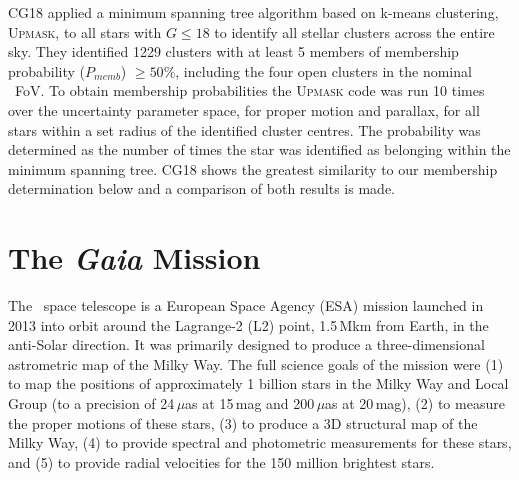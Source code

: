 CG18 applied a minimum spanning tree algorithm based on k-means clustering, \textsc{Upmask}, to all stars with $G\leq18$ to identify all stellar clusters across the entire sky. They identified 1229 clusters with at least 5 members of membership probability ($P_{memb}$) $\geq50\%$, including the four open clusters in the nominal \Kepler~FoV. To obtain membership probabilities the \textsc{Upmask} code was run 10 times over the uncertainty parameter space, for proper motion and parallax, for all stars within a set radius of the identified cluster centres. The probability was determined as the number of times the star was identified as belonging within the minimum spanning tree. CG18 shows the greatest similarity to our membership determination below and a comparison of both results is made.

\section{The {\em Gaia} Mission}
The \Gaia~space telescope is a European Space Agency (ESA) mission launched in 2013 into orbit around the Lagrange-2 (L2) point, 1.5\,Mkm from Earth, in the anti-Solar direction. It was primarily designed to produce a three-dimensional astrometric map of the Milky Way. The full science goals of the mission were (1) to map the positions of approximately 1 billion stars in the Milky Way and Local Group (to a precision of 24\,$\mu$as at 15\,mag and 200\,$\mu$as at 20\,mag), (2) to measure the proper motions of these stars, (3) to produce a 3D structural map of the Milky Way, (4) to provide spectral and photometric measurements for these stars, and (5) to provide radial velocities for the 150 million brightest stars.



